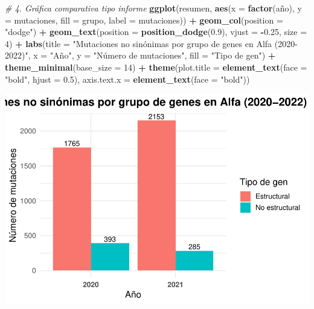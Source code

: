 \documentclass[
]{article}
\newenvironment{Shaded}{\begin{snugshade}}{\end{snugshade}}
\newcommand{\AttributeTok}[1]{\textcolor[rgb]{0.13,0.29,0.53}{#1}}
\newcommand{\CommentTok}[1]{\textcolor[rgb]{0.56,0.35,0.01}{\textit{#1}}}
\newcommand{\DecValTok}[1]{\textcolor[rgb]{0.00,0.00,0.81}{#1}}
\newcommand{\FloatTok}[1]{\textcolor[rgb]{0.00,0.00,0.81}{#1}}
\newcommand{\FunctionTok}[1]{\textcolor[rgb]{0.13,0.29,0.53}{\textbf{#1}}}
\newcommand{\NormalTok}[1]{#1}
\newcommand{\SpecialCharTok}[1]{\textcolor[rgb]{0.81,0.36,0.00}{\textbf{#1}}}
\newcommand{\StringTok}[1]{\textcolor[rgb]{0.31,0.60,0.02}{#1}}
\begin{document}
\begin{Shaded}
\begin{Highlighting}[]
\CommentTok{\# 4. Gráfica comparativa tipo informe}
\FunctionTok{ggplot}\NormalTok{(resumen, }\FunctionTok{aes}\NormalTok{(}\AttributeTok{x =} \FunctionTok{factor}\NormalTok{(año), }\AttributeTok{y =}\NormalTok{ mutaciones, }\AttributeTok{fill =}\NormalTok{ grupo, }\AttributeTok{label =}\NormalTok{ mutaciones)) }\SpecialCharTok{+}
  \FunctionTok{geom\_col}\NormalTok{(}\AttributeTok{position =} \StringTok{"dodge"}\NormalTok{) }\SpecialCharTok{+}
  \FunctionTok{geom\_text}\NormalTok{(}\AttributeTok{position =} \FunctionTok{position\_dodge}\NormalTok{(}\FloatTok{0.9}\NormalTok{), }\AttributeTok{vjust =} \SpecialCharTok{{-}}\FloatTok{0.25}\NormalTok{, }\AttributeTok{size =} \DecValTok{4}\NormalTok{) }\SpecialCharTok{+}
  \FunctionTok{labs}\NormalTok{(}\AttributeTok{title =} \StringTok{"Mutaciones no sinónimas por grupo de genes en Alfa (2020{-}2022)"}\NormalTok{,}
       \AttributeTok{x =} \StringTok{"Año"}\NormalTok{, }\AttributeTok{y =} \StringTok{"Número de mutaciones"}\NormalTok{, }\AttributeTok{fill =} \StringTok{"Tipo de gen"}\NormalTok{) }\SpecialCharTok{+}
  \FunctionTok{theme\_minimal}\NormalTok{(}\AttributeTok{base\_size =} \DecValTok{14}\NormalTok{) }\SpecialCharTok{+}
  \FunctionTok{theme}\NormalTok{(}\AttributeTok{plot.title =} \FunctionTok{element\_text}\NormalTok{(}\AttributeTok{face =} \StringTok{"bold"}\NormalTok{, }\AttributeTok{hjust =} \FloatTok{0.5}\NormalTok{),}
        \AttributeTok{axis.text.x =} \FunctionTok{element\_text}\NormalTok{(}\AttributeTok{face =} \StringTok{"bold"}\NormalTok{))}
\end{Highlighting}
\end{Shaded}

\includegraphics{situacion_problema_files/figure-latex/unnamed-chunk-4-2.pdf}
\end{document}
